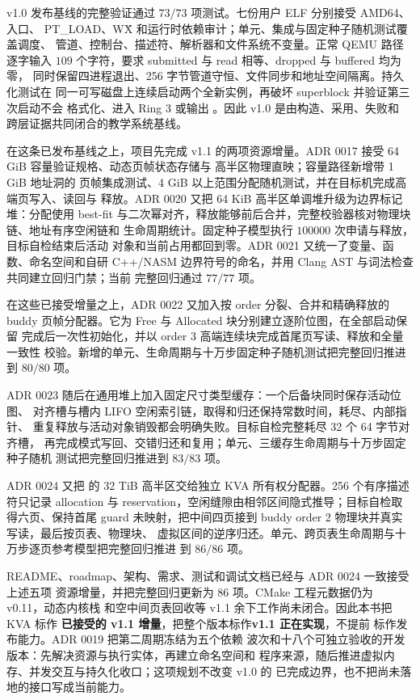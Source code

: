 v1.0 发布基线的完整验证通过 \(73/73\) 项测试。七份用户 ELF 分别接受 AMD64、入口、
PT\_LOAD、W\^X 和运行时依赖审计；单元、集成与固定种子随机测试覆盖调度、
管道、控制台、描述符、解析器和文件系统不变量。正常 QEMU 路径逐字输入
\(109\) 个字符，要求 submitted 与 read 相等、dropped 与 buffered 均为零，
同时保留四进程退出、256 字节管道守恒、文件同步和地址空间隔离。持久化测试在
同一可写磁盘上连续启动两个全新实例，再破坏 superblock 并验证第三次启动不会
格式化、进入 Ring 3 或输出 。因此 v1.0 是由构造、采用、失败和
跨层证据共同闭合的教学系统基线。

在这条已发布基线之上，项目先完成 v1.1 的两项资源增量。ADR 0017 接受
64 GiB 容量验证规格、动态页帧状态存储与
 高半区物理直映；容量路径新增带 1 GiB 地址洞的
页帧集成测试、4 GiB 以上范围分配随机测试，并在目标机完成高端页写入、读回与
释放。ADR 0020 又把 64 KiB 高半区单调堆升级为边界标记堆：分配使用 best-fit
与二次幂对齐，释放能够前后合并，完整校验器核对物理块链、地址有序空闲链和
生命周期统计。固定种子模型执行 \(100000\) 次申请与释放，目标自检结束后活动
对象和当前占用都回到零。ADR 0021 又统一了变量、函数、命名空间和自研
C++/NASM 边界符号的命名，并用 Clang AST 与词法检查共同建立回归门禁；当前
完整回归通过 \(77/77\) 项。

在这些已接受增量之上，ADR 0022 又加入按 order 分裂、合并和精确释放的
buddy 页帧分配器。它为 Free 与 Allocated 块分别建立逐阶位图，在全部启动保留
完成后一次性初始化，并以 order 3 高端连续块完成首尾页写读、释放和全量一致性
校验。新增的单元、生命周期与十万步固定种子随机测试把完整回归推进到
\(80/80\) 项。

ADR 0023 随后在通用堆上加入固定尺寸类型缓存：一个后备块同时保存活动位图、
对齐槽与槽内 LIFO 空闲索引链，取得和归还保持常数时间，耗尽、内部指针、
重复释放与活动对象销毁都会明确失败。目标自检完整耗尽 32 个 64 字节对齐槽，
再完成模式写回、交错归还和复用；单元、三缓存生命周期与十万步固定种子随机
测试把完整回归推进到 \(83/83\) 项。

ADR 0024 又把  的 32 TiB
高半区交给独立 KVA 所有权分配器。256 个有序描述符只记录 allocation 与
reservation，空闲缝隙由相邻区间隐式推导；目标自检取得六页、保持首尾 guard
未映射，把中间四页接到 buddy order 2 物理块并真实写读，最后按页表、物理块、
虚拟区间的逆序归还。单元、跨页表生命周期与十万步逐页参考模型把完整回归推进
到 \(86/86\) 项。

README、roadmap、架构、需求、测试和调试文档已经与 ADR 0024 一致接受上述五项
资源增量，并把完整回归更新为 86 项。CMake 工程元数据仍为 v0.11，动态内核栈
和空中间页表回收等 v1.1 余下工作尚未闭合。因此本书把 KVA 标作
\textbf{已接受的 v1.1 增量}，把整个版本标作\textbf{v1.1 正在实现}，不提前
标作发布能力。ADR 0019 把第二周期冻结为五个依赖
波次和十八个可独立验收的开发版本：先解决资源与执行实体，再建立命名空间和
程序来源，随后推进虚拟内存、并发交互与持久化收口；这项规划不改变 v1.0 的
已完成边界，也不把尚未落地的接口写成当前能力。

